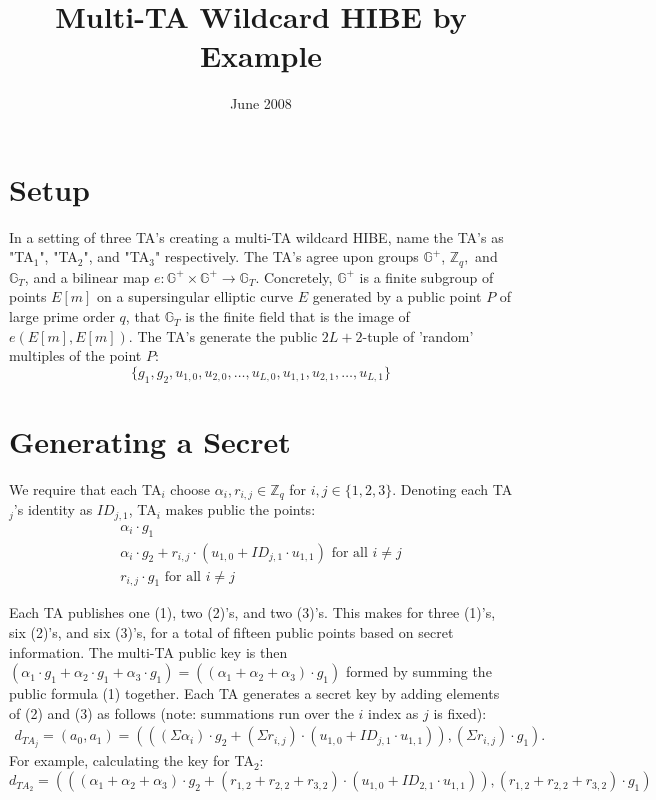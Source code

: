 \documentclass[10pt]{article}
\title{Multi-TA Wildcard HIBE by Example}
\author{  }
\date{ June 2008 }
\begin{document}
\ifpdf
{}
\else
{}
\fi

\maketitle


\section*{Setup}

In a setting of three TA's creating a multi-TA wildcard HIBE, name the TA's as "TA$_1$", "TA$_2$", and "TA$_3$" respectively.  The TA's agree upon groups $\mathbb{G}^+$, $\mathbb{Z}_q,$ and $\mathbb{G}_T$, and a bilinear map $e: \mathbb{G}^+ \times \mathbb{G}^+ \rightarrow \mathbb{G}_T$.  Concretely, $\mathbb{G}^+$ is a finite subgroup of points $E[m]$ on a supersingular elliptic curve $E$ generated by a public point $P$ of large prime order $q$, that $\mathbb{G}_T$ is the finite field that is the image of $e(E[m], E[m])$.  The TA's generate the public $2L + 2$-tuple of 'random' multiples of the point $P$:
$$\{g_1, g_2, u_{1,0}, u_{2,0}, \dots, u_{L, 0},u_{1,1}, u_{2,1}, \dots, u_{L,1}\}$$

\section*{Generating a Secret}
We require that each TA$_i$ choose $\alpha_i, r_{i,j} \in \mathbb{Z}_q$ for $i,j \in \{1, 2, 3\}$. Denoting each 
TA$_j$'s identity as $ID_{j,1}$, TA$_i$ makes public the points:
\begin{eqnarray}
	\alpha_i \cdot g_1\\
	\alpha_i \cdot g_2 + r_{i,j} \cdot (u_{1,0} + ID_{j,1} \cdot u_{1,1})\text{ for all } i \not= j\\
	r_{i,j}\cdot g_1 \text{ for all } i \not= j
\end{eqnarray}

Each TA publishes one (1), two (2)'s, and two (3)'s.  This makes for three (1)'s, six (2)'s, and six (3)'s, for a total of fifteen public points based on secret information.  The multi-TA public key is then $(\alpha_1 \cdot g_1 + \alpha_2 \cdot g_1 + \alpha_3 \cdot g_1) = ( (\alpha_1 + \alpha_2 + \alpha_3) \cdot g_1)$ formed by summing the public formula (1) together.  Each TA generates a secret key by adding elements of (2) and (3) as follows (note: summations run over the $i$ index as $j$ is fixed):
\begin{align*}
d_{TA_j} = (a_0, a_1) = (((\Sigma \alpha_i)\cdot g_2 + (\Sigma r_{i,j}) \cdot (u_{1,0} + ID_{j,1} \cdot u_{1,1})), 
(\Sigma r_{i,j}) \cdot g_1).
\end{align*}
For example, calculating the key for TA$_2$:
$$d_{TA_2} = (((\alpha_1 + \alpha_2 + \alpha_3) \cdot g_2 + (r_{1,2} + r_{2,2} + r_{3,2}) \cdot (u_{1,0} + ID_{2,1} \cdot u_{1,1})), (r_{1,2} + r_{2,2} + r_{3,2}) \cdot g_1)$$
\end{document}
